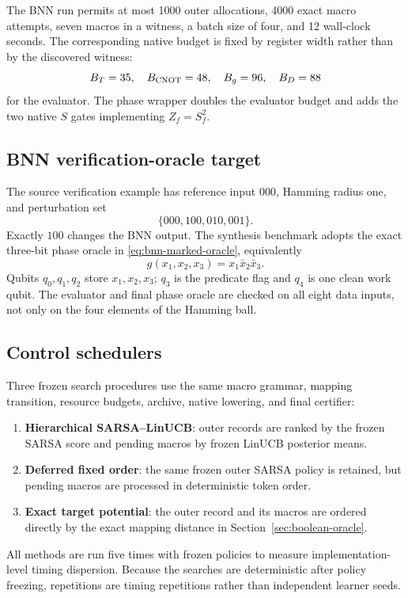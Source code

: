 The BNN run permits at most 1000 outer allocations, 4000 exact macro attempts, seven macros in a witness, a batch size of four, and 12 wall-clock seconds.  The corresponding native budget is fixed by register width rather than by the discovered witness:
\begin{equation}
B_T=35,
\quad B_{\operatorname{CNOT}}=48,
\quad B_g=96,
\quad B_D=88
\end{equation}
for the evaluator.  The phase wrapper doubles the evaluator budget and adds the two native $S$ gates implementing $Z_f=S_f^2$.

\subsection{BNN verification-oracle target}

The source verification example has reference input $000$, Hamming radius one, and perturbation set
\begin{equation}
\{000,100,010,001\}.
\end{equation}
Exactly $100$ changes the BNN output.  The synthesis benchmark adopts the exact three-bit phase oracle in \eqref{eq:bnn-marked-oracle}, equivalently
\begin{equation}
g(x_1,x_2,x_3)=x_1\bar x_2\bar x_3.
\end{equation}
Qubits $q_0,q_1,q_2$ store $x_1,x_2,x_3$; $q_3$ is the predicate flag and $q_4$ is one clean work qubit.  The evaluator and final phase oracle are checked on all eight data inputs, not only on the four elements of the Hamming ball.

\subsection{Control schedulers}

Three frozen search procedures use the same macro grammar, mapping transition, resource budgets, archive, native lowering, and final certifier:
\begin{enumerate}
\item \textbf{Hierarchical SARSA--LinUCB}: outer records are ranked by the frozen SARSA score and pending macros by frozen LinUCB posterior means.
\item \textbf{Deferred fixed order}: the same frozen outer SARSA policy is retained, but pending macros are processed in deterministic token order.
\item \textbf{Exact target potential}: the outer record and its macros are ordered directly by the exact mapping distance in Section~\ref{sec:boolean-oracle}.
\end{enumerate}
All methods are run five times with frozen policies to measure implementation-level timing dispersion.  Because the searches are deterministic after policy freezing, repetitions are timing repetitions rather than independent learner seeds.

